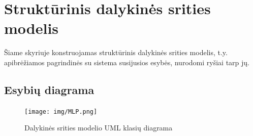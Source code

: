 \documentclass{VUMIFPSkursinis}
\begin{document}
    \section{Struktūrinis dalykinės srities modelis} \label{strukturinisDSModelis}
		Šiame skyriuje konstruojamas struktūrinis dalykinės srities modelis, t.y. apibrėžiamos pagrindinės su sistema susijusios esybės, nurodomi ryšiai tarp jų.
        \subsection{Esybių diagrama} \label{strukturinisDSModelis_esybiuDiagrama}
            \begin{figure}[H]
                \centering
                \texttt{[image: img/MLP.png]}
                \caption{Dalykinės srities modelio UML klasių diagrama}
                \label{fig:DS-klasiu-diagrama}
            \end{figure}
\end{document}

